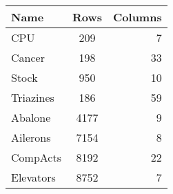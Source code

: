 \begin{tabular}{lcr}
	\toprule
	\textbf{Name} & \textbf{Rows} & \textbf{Columns} \\\midrule
	CPU           & 209           & 7                \\
	Cancer        & 198           & 33               \\
	Stock         & 950           & 10               \\
	Triazines     & 186           & 59               \\
	\addlinespace
	Abalone       & 4177          & 9                \\
	Ailerons      & 7154          & 8                \\
	CompActs      & 8192          & 22               \\
	Elevators     & 8752          & 7                \\\bottomrule
\end{tabular}

